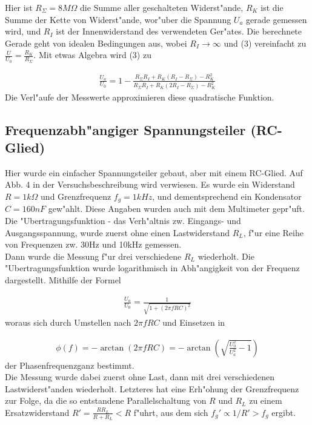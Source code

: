 \documentclass[10pt]{article}
\begin{document}
Hier ist $R_{\Sigma}=8M\Omega$ die Summe aller geschalteten Widerst"ande, $R_K$ ist die Summe der Kette von Widerst"ande, wor"uber die Spannung $U_a$ gerade gemessen wird, und $R_I$ ist der Innenwiderstand des verwendeten Ger"ates. Die berechnete Gerade geht von idealen Bedingungen aus, wobei $R_I \rightarrow \infty$ und (3) vereinfacht zu $\frac{U}{U_0} = \frac{R_K}{R_{\Sigma}}$. Mit etwas Algebra wird (3) zu

\begin{eqnarray}
 \frac{U_a}{U_0} = 1-\frac{R_{\Sigma}R_I+R_K(R_I-R_{\Sigma})-R_K^2}{R_{\Sigma}R_I+R_K(2R_I-R_{\Sigma})-R_K^2}
\end{eqnarray}
\noindent
Die Verl"aufe der Messwerte approximieren diese quadratische Funktion.
\newpage
\subsection{Frequenzabh"angiger Spannungsteiler (RC-Glied)}

Hier wurde ein einfacher Spannungsteiler gebaut, aber mit einem RC-Glied. Auf Abb. 4 in der Versuchsbeschreibung wird verwiesen. Es wurde ein Widerstand $R=1k\Omega$ und Grenzfrequenz $f_g=1kHz$, und dementsprechend ein Kondensator $C=160nF$ gew"ahlt. Diese Angaben wurden auch mit dem Multimeter gepr"uft. Die "Ubertragungsfunktion - das Verh"altnis zw. Eingangs- und Ausgangsspannung, wurde zuerst ohne einen Lastwiderstand $R_L$, f"ur eine Reihe von Frequenzen zw. 30Hz und 10kHz gemessen.\\

Dann wurde die Messung f"ur drei verschiedene $R_L$ wiederholt. Die "Ubertragungsfunktion wurde logarithmisch in Abh"angigkeit von der Frequenz dargestellt. Mithilfe der Formel

\begin{eqnarray}
 \frac{U_a}{U_0} = \frac{1}{\sqrt{1+(2\pi fRC)^2}}
\end{eqnarray}
\noindent
woraus sich durch Umstellen nach $2\pi fRC$ und Einsetzen in

\begin{eqnarray}
 \phi (f) = -\arctan(2\pi fRC) = -\arctan(\sqrt{\frac{U_0^2}{U_a^2}-1})
\end{eqnarray}
\noindent
der Phasenfrequenzganz bestimmt.\\

Die Messung wurde dabei zuerst ohne Last, dann mit drei verschiedenen Lastwiderst"anden wiederholt. Letzteres hat eine Erh"ohung der Grenzfrequenz zur Folge, da die so entstandene Parallelschaltung von $R$ und $R_L$ zu einem Ersatzwiderstand $R'=\frac{RR_L}{R+R_L}<R$ f"uhrt, aus dem sich $f_g'\propto{1/R'}>f_g$ ergibt.\\
\end{document}
